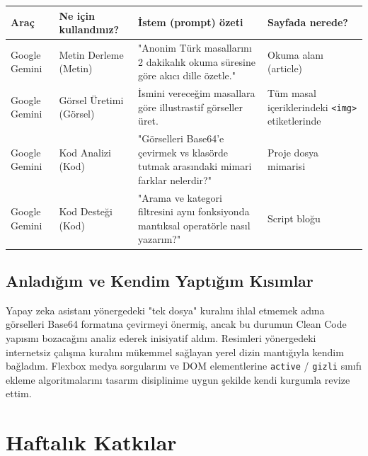 \documentclass[12pt,a4paper]{article}
\begin{document}
\begin{longtable}{@{}p{2.6cm}p{3.6cm}p{4.2cm}p{3.4cm}@{}}
\toprule
\textbf{Araç} & \textbf{Ne için kullandınız?} & \textbf{İstem (prompt) özeti} & \textbf{Sayfada nerede?} \\
\midrule
\endhead
Google Gemini & Metin Derleme (Metin) & "Anonim Türk masallarını 2 dakikalık okuma süresine göre akıcı dille özetle." & Okuma alanı (article) \\
Google Gemini & Görsel Üretimi (Görsel) & İsmini vereceğim masallara göre illustrastif görseller üret. & Tüm masal içeriklerindeki \texttt{<img>} etiketlerinde \\
Google Gemini & Kod Analizi (Kod) & "Görselleri Base64'e çevirmek vs klasörde tutmak arasındaki mimari farklar nelerdir?" & Proje dosya mimarisi \\
Google Gemini & Kod Desteği (Kod) & "Arama ve kategori filtresini aynı fonksiyonda mantıksal operatörle nasıl yazarım?" & Script bloğu \\
\bottomrule
\end{longtable}

\subsection{Anladığım ve Kendim Yaptığım Kısımlar}
Yapay zeka asistanı yönergedeki "tek dosya" kuralını ihlal etmemek adına görselleri Base64 formatına çevirmeyi önermiş, ancak bu durumun Clean Code yapısını bozacağını analiz ederek inisiyatif aldım. Resimleri yönergedeki internetsiz çalışma kuralını mükemmel sağlayan yerel dizin mantığıyla kendim bağladım. Flexbox medya sorgularını ve DOM elementlerine \texttt{active} / \texttt{gizli} sınıfı ekleme algoritmalarını tasarım disiplinime uygun şekilde kendi kurgumla revize ettim.

\section{Haftalık Katkılar}
\end{document}
